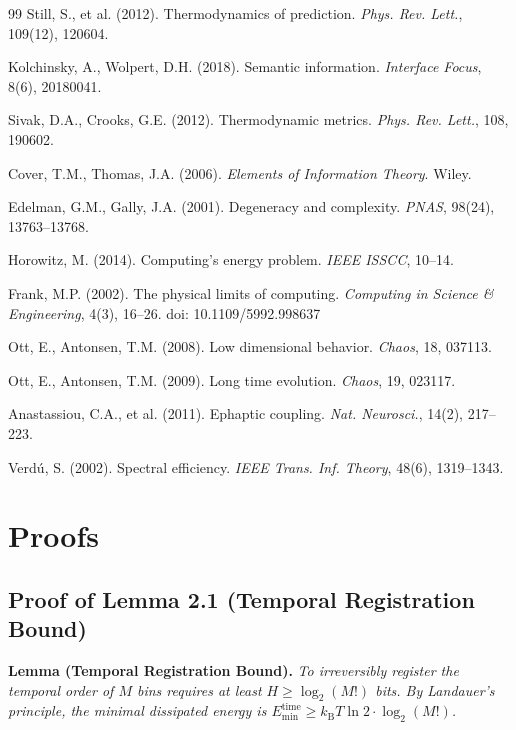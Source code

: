 \documentclass[12pt]{article}
\numberwithin{equation}{section}
\newcommand{\kB}{k_{\mathrm{B}}}
\begin{document}
\begin{thebibliography}{99}
Still, S., et al. (2012). Thermodynamics of prediction. \textit{Phys. Rev. Lett.}, 109(12), 120604.

Kolchinsky, A., Wolpert, D.H. (2018). Semantic information. \textit{Interface Focus}, 8(6), 20180041.

Sivak, D.A., Crooks, G.E. (2012). Thermodynamic metrics. \textit{Phys. Rev. Lett.}, 108, 190602.

Cover, T.M., Thomas, J.A. (2006). \textit{Elements of Information Theory}. Wiley.

Edelman, G.M., Gally, J.A. (2001). Degeneracy and complexity. \textit{PNAS}, 98(24), 13763--13768.

Horowitz, M. (2014). Computing's energy problem. \textit{IEEE ISSCC}, 10--14.

Frank, M.P. (2002). The physical limits of computing. \textit{Computing in Science \& Engineering}, 4(3), 16--26. doi: 10.1109/5992.998637

Ott, E., Antonsen, T.M. (2008). Low dimensional behavior. \textit{Chaos}, 18, 037113.

Ott, E., Antonsen, T.M. (2009). Long time evolution. \textit{Chaos}, 19, 023117.

Anastassiou, C.A., et al. (2011). Ephaptic coupling. \textit{Nat. Neurosci.}, 14(2), 217--223.

Verd{\'u}, S. (2002). Spectral efficiency. \textit{IEEE Trans. Inf. Theory}, 48(6), 1319--1343.

\end{thebibliography}

\appendix

\section{Proofs}
\label{appendix:proofs}

\subsection{Proof of Lemma 2.1 (Temporal Registration Bound)}

\noindent\textbf{Lemma (Temporal Registration Bound).} \emph{To irreversibly register the temporal order of $M$ bins requires at least $H \ge \log_2(M!)$ bits. By Landauer's principle, the minimal dissipated energy is $E_{\min}^{\mathrm{time}} \ge \kB T\ln 2 \cdot \log_2(M!)$.}
\end{document}

